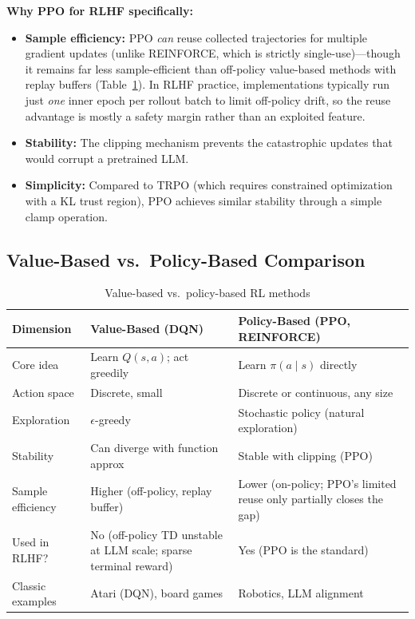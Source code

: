 \textbf{Why PPO for RLHF specifically:}
\begin{itemize}
    \item \textbf{Sample efficiency:} PPO \textit{can} reuse collected trajectories for multiple gradient updates (unlike REINFORCE, which is strictly single-use)---though it remains far less sample-efficient than off-policy value-based methods with replay buffers (Table~\ref{tab:value_vs_policy}). In RLHF practice, implementations typically run just \textit{one} inner epoch per rollout batch to limit off-policy drift, so the reuse advantage is mostly a safety margin rather than an exploited feature.
    \item \textbf{Stability:} The clipping mechanism prevents the catastrophic updates that would corrupt a pretrained LLM.
    \item \textbf{Simplicity:} Compared to TRPO (which requires constrained optimization with a KL trust region), PPO achieves similar stability through a simple clamp operation.
\end{itemize}

\subsection{Value-Based vs.\ Policy-Based Comparison}

\begin{table}[H]
\centering
\caption{Value-based vs.\ policy-based RL methods}
\label{tab:value_vs_policy}
\begin{tabularx}{\textwidth}{lXX}
\toprule
\textbf{Dimension} & \textbf{Value-Based (DQN)} & \textbf{Policy-Based (PPO, REINFORCE)} \\
\midrule
Core idea & Learn $Q(s,a)$; act greedily & Learn $\pi(a \mid s)$ directly \\
Action space & Discrete, small & Discrete or continuous, any size \\
Exploration & $\epsilon$-greedy & Stochastic policy (natural exploration) \\
Stability & Can diverge with function approx & Stable with clipping (PPO) \\
Sample efficiency & Higher (off-policy, replay buffer) & Lower (on-policy; PPO's limited reuse only partially closes the gap) \\
Used in RLHF? & No (off-policy TD unstable at LLM scale; sparse terminal reward) & Yes (PPO is the standard) \\
Classic examples & Atari (DQN), board games & Robotics, LLM alignment \\
\bottomrule
\end{tabularx}
\end{table}

